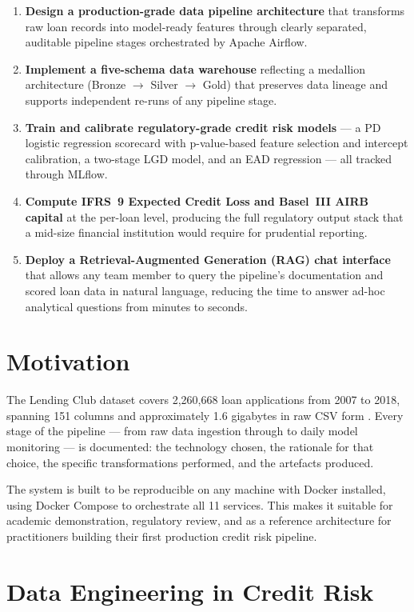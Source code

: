 \documentclass[12pt,a4paper]{report}
\begin{document}
\begin{enumerate}[leftmargin=2em]
  \item \textbf{Design a production-grade data pipeline architecture} that transforms raw loan records into model-ready features through clearly separated, auditable pipeline stages orchestrated by Apache Airflow.
  \item \textbf{Implement a five-schema data warehouse} reflecting a medallion architecture (Bronze $\to$ Silver $\to$ Gold) that preserves data lineage and supports independent re-runs of any pipeline stage.
  \item \textbf{Train and calibrate regulatory-grade credit risk models} --- a PD logistic regression scorecard with p-value-based feature selection and intercept calibration, a two-stage LGD model, and an EAD regression --- all tracked through MLflow.
  \item \textbf{Compute IFRS~9 Expected Credit Loss and Basel~III AIRB capital} at the per-loan level, producing the full regulatory output stack that a mid-size financial institution would require for prudential reporting.
  \item \textbf{Deploy a Retrieval-Augmented Generation (RAG) chat interface} that allows any team member to query the pipeline's documentation and scored loan data in natural language, reducing the time to answer ad-hoc analytical questions from minutes to seconds.
\end{enumerate}

\section{Motivation}

The Lending Club dataset covers 2,260,668 loan applications from 2007 to 2018, spanning 151 columns and approximately 1.6 gigabytes in raw CSV form \cite{kaggle2018}. Every stage of the pipeline --- from raw data ingestion through to daily model monitoring --- is documented: the technology chosen, the rationale for that choice, the specific transformations performed, and the artefacts produced.

The system is built to be reproducible on any machine with Docker installed, using Docker Compose to orchestrate all 11 services. This makes it suitable for academic demonstration, regulatory review, and as a reference architecture for practitioners building their first production credit risk pipeline.

\section{Data Engineering in Credit Risk}
\end{document}
